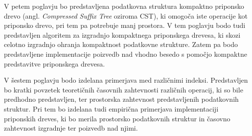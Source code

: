 
V petem poglavju bo predstavljena podatkovna struktura kompaktno priponsko drevo (angl. \textit{Compressed Suffix Tree} oziroma CST), ki omogoča iste operacije kot priponsko drevo, pri tem pa potrebuje manj prostora. V tem poglavju bodo tudi predstavljen algoritem za izgradnjo kompaktnega priponskega drevesa, ki skozi celotno izgradnjo ohranja kompaktnost podatkovne strukture. Zatem pa bodo predstavljene implementacije poizvedb nad vhodno besedo s pomočjo kompaktne predstavitve priponskega drevesa.

V šestem poglavju bodo izdelana primerjava med različnimi indeksi. Predstavljen bo kratki povzetek teoretičnih časovnih zahtevnosti različnih operacij, ki so bile predhodno predstavljen, ter prostorska zahtevnost predstavljenih podatkovnih struktur. Pri tem bo izdelana tudi empirična primerjava implementaciji priponskih dreves, ki bo merila prostorsko podatkovnih struktur in časovno zahtevnost izgradnje ter poizvedb nad njimi.